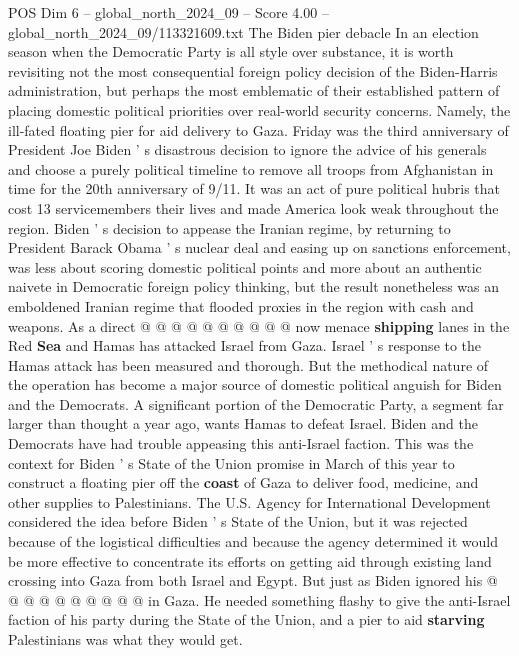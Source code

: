\begin{textsample}{POS Dim 6 – global\_north\_2024\_09 – Score 4.00 – global\_north\_2024\_09/113321609.txt}  \label{ex:f6_pos_365}
The Biden pier debacle In an election season when the Democratic Party is all style over substance, it is worth revisiting not the most consequential foreign policy decision of the Biden-Harris administration, but perhaps the most emblematic of their established pattern of placing domestic political priorities over real-world security concerns.
Namely, the ill-fated floating pier for aid delivery to Gaza.
Friday was the third anniversary of President Joe Biden ' s disastrous decision to ignore the advice of his generals and choose a purely political timeline to remove all troops from Afghanistan in time for the 20th anniversary of 9/11.
It was an act of pure political hubris that cost 13 servicemembers their lives and made America look weak throughout the region.
Biden ' s decision to appease the Iranian regime, by returning to President Barack Obama ' s nuclear deal and easing up on sanctions enforcement, was less about scoring domestic political points and more about an authentic naivete in Democratic foreign policy thinking, but the result nonetheless was an emboldened Iranian regime that flooded proxies in the region with cash and weapons.
As a direct @ @ @ @ @ @ @ @ @ @ now menace \textbf{shipping} lanes in the Red \textbf{Sea} and Hamas has attacked Israel from Gaza.
Israel ' s response to the Hamas attack has been measured and thorough.
But the methodical nature of the operation has become a major source of domestic political anguish for Biden and the Democrats.
A significant portion of the Democratic Party, a segment far larger than thought a year ago, wants Hamas to defeat Israel.
Biden and the Democrats have had trouble appeasing this anti-Israel faction.
This was the context for Biden ' s State of the Union promise in March of this year to construct a floating pier off the \textbf{coast} of Gaza to deliver food, medicine, and other supplies to Palestinians.
The U.S.
Agency for International Development considered the idea before Biden ' s State of the Union, but it was rejected because of the logistical difficulties and because the agency determined it would be more effective to concentrate its efforts on getting aid through existing land crossing into Gaza from both Israel and Egypt.
But just as Biden ignored his @ @ @ @ @ @ @ @ @ @ in Gaza.
He needed something flashy to give the anti-Israel faction of his party during the State of the Union, and a pier to aid \textbf{starving} Palestinians was what they would get.

\end{textsample}
